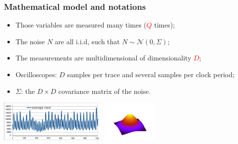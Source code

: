 \documentclass{beamer}
\begin{document}
\begin{frame}

\frametitle{Mathematical model and notations}

\begin{itemize}

\item Those variables are measured many times (\textcolor{red}{$Q$} times);
\pause 

\item The noise $N$ are all i.i.d, such that $N \sim \mathcal{N}(0, \Sigma);$
\pause 

\item The measurements are multidimensional of dimensionality \textcolor{red}{$D$};
\pause 

\item Oscilloscopes: $D$ samples per trace and several samples per clock period;%
\pause
\item $\Sigma$: the $D\times D$ covariance matrix of the noise.%

\end{itemize}
\pause
\begin{center}
\includegraphics[height=2cm]{average_trace.png}\ %
\includegraphics[height=2cm]{gaussian2d_2.png}
\end{center}

\end{frame}
\end{document}
